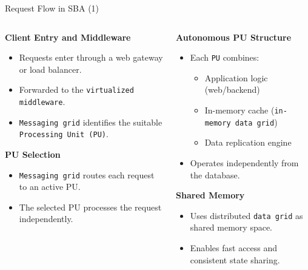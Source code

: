 \documentclass[aspectratio=169, table]{beamer}
\begin{document}
	\begin{frame}{Request Flow in SBA (1)}
		\vspace{20pt}
		\begin{columns}[t]
			\begin{column}{0.5\textwidth}
				\textbf{Client Entry and Middleware}
				\begin{itemize}
					\item Requests enter through a web gateway or load balancer.
					\item Forwarded to the \texttt{virtualized middleware}.
					\item \texttt{Messaging grid} identifies the suitable \texttt{Processing Unit (PU)}.
				\end{itemize}
				
				\textbf{PU Selection}
				\begin{itemize}
					\item \texttt{Messaging grid} routes each request to an active PU.
					\item The selected PU processes the request independently.
				\end{itemize}
			\end{column}
			
			\begin{column}{0.5\textwidth}
				\textbf{Autonomous PU Structure}
				\begin{itemize}
					\item Each \texttt{PU} combines:
					\begin{itemize}
						\item Application logic (web/backend)
						\item In-memory cache (\texttt{in-memory data grid})
						\item Data replication engine
					\end{itemize}
					\item Operates independently from the database.
				\end{itemize}
				
				\textbf{Shared Memory}
				\begin{itemize}
					\item Uses distributed \texttt{data grid} as shared memory space.
					\item Enables fast access and consistent state sharing.
				\end{itemize}
			\end{column}
		\end{columns}
	\end{frame}
	
\end{document}
